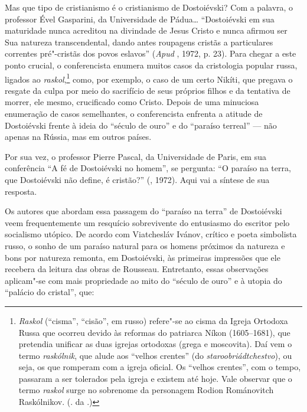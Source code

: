 Mas que tipo de cristianismo é o cristianismo de Dostoiévski? Com a
palavra, o professor Ével Gasparini, da Universidade de Pádua\ldots{}
``Dostoiévski em sua maturidade nunca acreditou na divindade de Jesus
Cristo e nunca afirmou ser Sua natureza transcendental, dando antes
roupagens cristãs a particulares correntes pré"-cristãs dos povos
eslavos'' (\emph{Apud} , 1972, p. 23). Para chegar a este ponto
crucial, o conferencista enumera muitos casos da cristologia popular
russa, ligados ao \emph{raskol},\footnote{\emph{Raskol} (``cisma'',
  ``cisão'', em russo) refere"-se ao cisma da Igreja Ortodoxa Russa que
  ocorreu devido às reformas do patriarca Níkon (1605--1681), que
  pretendia unificar as duas igrejas ortodoxas (grega e moscovita). Daí
  vem o termo \emph{raskólnik}, que alude aos ``velhos crentes'' (do
  \emph{staroobriádtchestvo}), ou seja, os que romperam com a igreja
  oficial. Os ``velhos crentes'', com o tempo, passaram a ser tolerados
  pela igreja e existem até hoje. Vale observar que o termo
  \emph{raskol} surge no sobrenome da personagem Rodion Románovitch
  Raskólnikov. (. da .)} como, por exemplo, o caso de um certo
Nikíti, que pregava o resgate da culpa por meio do sacrifício de seus
próprios filhos e da tentativa de morrer, ele mesmo, crucificado como
Cristo. Depois de uma minuciosa enumeração de casos semelhantes, o
conferencista enfrenta a atitude de Dostoiévski frente à ideia do
``século de ouro'' e do ``paraíso terreal'' --- não apenas na Rússia, mas
em outros países.

Por sua vez, o professor Pierre Pascal, da Universidade de Paris, em sua
conferência ``A fé de Dostoiévski no homem'', se pergunta: ``O paraíso
na terra, que Dostoiévski não define, é cristão?'' (, 1972). Aqui vai a síntese de sua
resposta.

Os autores que abordam essa passagem do ``paraíso na terra'' de
Dostoiévski veem frequentemente um resquício sobrevivente do entusiasmo
do escritor pelo socialismo utópico. De acordo com Viatchesláv Ivánov,
crítico e poeta simbolista russo, o sonho de um paraíso natural para os
homens próximos da natureza e bons por natureza remonta, em Dostoiévski,
às primeiras impressões que ele recebera da leitura das obras de
Rousseau. Entretanto, essas observações aplicam"-se com mais propriedade
ao mito do ``século de ouro'' e à utopia do ``palácio do cristal'', que:

